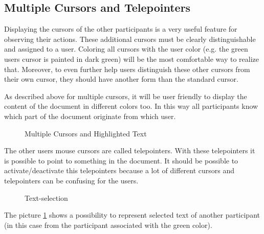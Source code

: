 \documentclass[11pt,a4paper]{article}
\begin{document}
\subsection{Multiple Cursors and Telepointers}
Displaying the cursors of the other participants is a very useful feature for observing their actions. These additional cursors must be clearly distinguishable and assigned to a user. Coloring all cursors with the user color (e.g. the green users cursor is painted in dark green) will be the most comfortable way to realize that. Moreover, to even further help users distinguish these other cursors from their own cursor, they should have another form than the standard cursor.

As described above for multiple cursors, it will be user friendly to display the content of the document in different colors too. In this way all participants know which part of the document originate from which user.
\begin{figure}[H]
 \centering
 \caption{Multiple Cursors and Highlighted Text}
\end{figure}
The other users mouse cursors are called telepointers. With these telepointers it is possible to point to something in the document. It should be possible to activate/deactivate this telepointers because a lot of different cursors and telepointers can be confusing for the users.
\begin{figure}[H]
\centering
{}
\caption{Text-selection}
\label{Text-selection}
\end{figure}
The picture \ref{Text-selection} shows a possibility to represent selected text of another participant (in this case from the participant associated with the green color).
\end{document}
